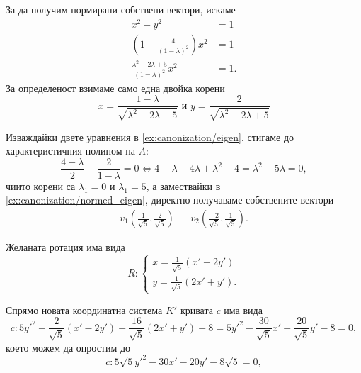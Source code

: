 \documentclass[
  numbers=endperiod,
  headings=standardclasses,
  bibliography=totocnumbered,
]{scrartcl}
\begin{document}
\begin{solution}
\begin{enumerate}
    За да получим нормирани собствени вектори, искаме
    \begin{align*}
      x^2 + y^2 &= 1 \\
      \left(1 +  \frac 4 {{(1 - \lambda)}^2} \right) x^2 &= 1 \\
      \frac {\lambda^2 - 2\lambda + 5} {{(1 - \lambda)}^2} x^2 &= 1.
    \end{align*}
    За определеност взимаме само една двойка корени
    \begin{equation}
      \label{ex:canonization/normed_eigen}
      x = \frac {1 - \lambda} {\sqrt{\lambda^2 - 2\lambda + 5}}
      \text{ и }
      y = \frac 2 {\sqrt{\lambda^2 - 2\lambda + 5}}
    \end{equation}

    Изваждайки двете уравнения в \eqref{ex:canonization/eigen}, стигаме до характеристичния полином на \( A \):
    \begin{equation*}
      \frac {4 - \lambda} 2 - \frac 2 {1 - \lambda} = 0 \iff 4 - \lambda - 4\lambda + \lambda^2 - 4 = \lambda^2 - 5\lambda = 0,
    \end{equation*}
    чиито корени са \( \lambda_1 = 0 \) и \( \lambda_1 = 5 \), а замествайки в \eqref{ex:canonization/normed_eigen}, директно получаваме собствените вектори
    \begin{align*}
      v_1 \left(\frac 1 {\sqrt 5}, \frac 2 {\sqrt 5} \right)
      &&
      v_2 \left(\frac {-2} {\sqrt 5}, \frac 1 {\sqrt 5} \right).
    \end{align*}

    Желаната ротация има вида
    \begin{equation*}
      R: \begin{cases}
        x = \frac 1 {\sqrt 5} (x' - 2y') \\
        y = \frac 1 {\sqrt 5} (2x' + y').
      \end{cases}
    \end{equation*}

    Спрямо новата координатна система \( K' \) кривата \( c \) има вида
    \begin{equation*}
      c: 5y'^2 + \frac 2 {\sqrt 5} (x' - 2y') - \frac {16} {\sqrt 5} (2x' + y') - 8 = 5y'^2 - \frac {30} {\sqrt 5} x' - \frac {20} {\sqrt 5} y' - 8 = 0,
    \end{equation*}
    което можем да опростим до
    \begin{equation*}
      c: 5 \sqrt 5 y'^2 - 30 x' - 20 y' - 8 \sqrt 5 = 0,
    \end{equation*}


\end{enumerate}
\end{solution}
\end{document}
